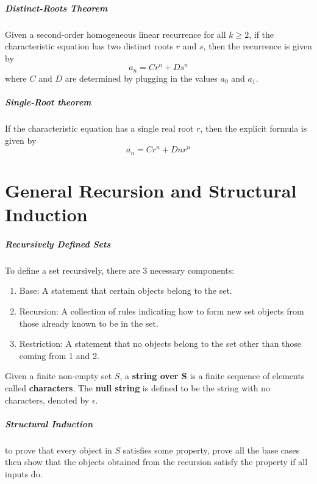 \documentclass[11pt]{article}
\begin{document}
	\subparagraph{Distinct-Roots Theorem} Given a second-order homogeneous linear recurrence for all $k \geq 2$, if the characteristic equation has two distinct roots $r$ and $s$, then the recurrence is given by 
	\begin{equation}
		a_n = Cr^n + Ds^n
	\end{equation}
	where $C$ and $D$ are determined by plugging in the values $a_0$ and $a_1$.
	
	\subparagraph{Single-Root theorem} If the characteristic equation has a single real root $r$, then the explicit formula is given by
	\begin{equation}
		a_n = Cr^n + Dnr^n
	\end{equation}
	
\section{General Recursion and Structural Induction}
	\subparagraph{Recursively Defined Sets} To define a set recursively, there are 3 necessary components:
	\begin{enumerate}
		\item Base: A statement that certain objects belong to the set.
		\item Recursion: A collection of rules indicating how to form new set objects from those already known to be in the set.
		\item Restriction: A statement that no objects belong to the set other than those coming from 1 and 2.
	\end{enumerate}
	Given a finite non-empty set $S$, a \textbf{string over S} is a finite sequence of elements called \textbf{characters}. The \textbf{null string} is defined to be the string with no characters, denoted by $\epsilon$.
	
	\subparagraph{Structural Induction} to prove that every object in $S$ satisfies some property, prove all the base cases then show that the objects obtained from the recursion satisfy the property if all inputs do.
%		
%		


\end{document}
